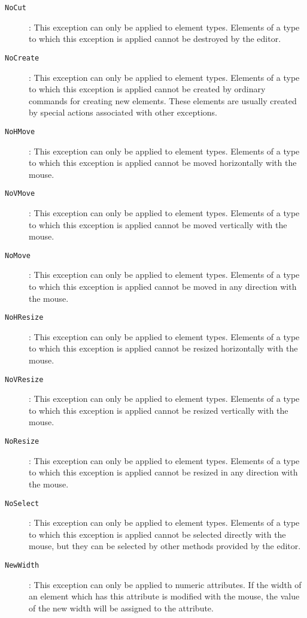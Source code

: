 \begin{description}
\item[{\tt NoCut}]: This exception can only be applied to element
types.  Elements of a type to which this exception is applied cannot
be destroyed by the editor.  

\item[{\tt NoCreate}]: This exception can only be applied to element
types.  Elements of a type to which this exception is applied cannot
be created by ordinary commands for creating new elements.  These
elements are usually created by special actions associated with other
exceptions. 

\item[{\tt NoHMove}]: This exception can only be applied to element
types.  Elements of a type to which this exception is applied cannot
be moved horizontally with the mouse.

\item[{\tt NoVMove}]: This exception can only be applied to element
types.  Elements of a type to which this exception is applied cannot
be moved vertically with the mouse.

\item[{\tt NoMove}]: This exception can only be applied to element
types.  Elements of a type to which this exception is applied cannot
be moved in any direction with the mouse.

\item[{\tt NoHResize}]: This exception can only be applied to element
types.  Elements of a type to which this exception is applied cannot
be resized horizontally with the mouse.

\item[{\tt NoVResize}]: This exception can only be applied to element
types.  Elements of a type to which this exception is applied cannot
be resized vertically with the mouse.

\item[{\tt NoResize}]: This exception can only be applied to element
types.  Elements of a type to which this exception is applied cannot
be resized in any direction with the mouse.

\item[{\tt NoSelect}]: This exception can only be applied to element
types.  Elements of a type to which this exception is applied cannot
be selected directly with the mouse, but they can be selected by other
methods provided by the editor.

\item[{\tt NewWidth}]: This exception can only be applied to numeric
attributes.  If the width of an element which has this attribute is
modified with the mouse, the value of the new width will be assigned
to the attribute.


\end{description}
